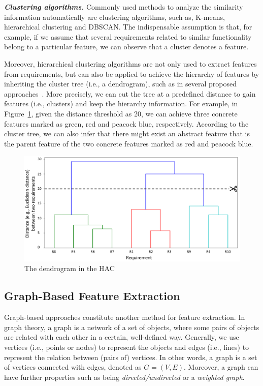 \documentclass[graybox]{svmult}
\begin{document}
\textit{\textbf{Clustering algorithms.}}
Commonly used methods to analyze the similarity information automatically are clustering algorithms, such as, K-means, hierarchical clustering and DBSCAN. The indispensable assumption is that, for example, if we assume that several requirements related to similar functionality belong to a particular feature, we can observe that a cluster denotes a feature. 

Moreover, hierarchical clustering algorithms are not only used to extract features from requirements, but can also be applied to achieve the hierarchy of features by inheriting the cluster tree (i.e., a dendrogram), such as in several proposed approaches~\cite{AlvesSBRSRPR08,WestonCR09,ItzikR14,LiSS18}. More precisely, we can cut the tree at a predefined distance to gain features (i.e., clusters) and keep the hierarchy information. For example, in Figure~\ref{fig:hac}, given the distance threshold as 20, we can achieve three concrete features marked as green, red and peacock blue, respectively. According to the cluster tree, we can also infer that there might exist an abstract feature that is the parent feature of the two concrete features marked as red and peacock blue.

\begin{figure}
\centering
\includegraphics[scale=0.4]{figs/hac.pdf}
\caption{The dendrogram in the HAC}
\label{fig:hac}
\end{figure}

\subsection{Graph-Based Feature Extraction}


Graph-based approaches constitute another method for feature extraction. In graph theory, a graph is a network of a set of objects, where some pairs of objects are related with each other in a certain, well-defined way. Generally, we use vertices (i.e., points or nodes) to represent the objects and edges (i.e., lines) to represent the relation between (pairs of) vertices. In other words, a graph is a set of vertices connected with edges, denoted as $G = (V,E)$. 
Moreover, a graph can have further properties such as being \textit{directed/undirected} or a \textit{weighted graph}.
\end{document}
